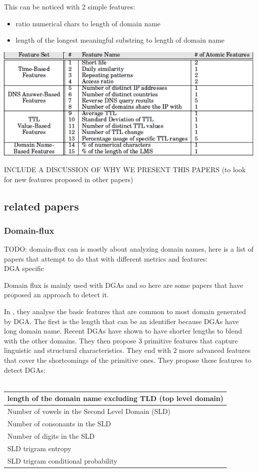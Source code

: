 This can be noticed with 2 simple features:\\
\begin{itemize}[noitemsep]
\item ratio numerical chars to length of domain name
\item length of the longest meaningful substring to length of domain name
\end{itemize}
\includegraphics[scale=.3]{img/exposure_features.png}


INCLUDE A DISCUSSION OF WHY WE PRESENT THIS PAPERS (to look for new features proposed in other papers)



\subsection{related papers}
\subsubsection{Domain-flux}
TODO: domain-flux can is mostly about analyzing domain names, here is a list of papers that attempt to do that with different metrics and features:  
\cite{dns-traffic}\\
DGA specific\\
\cite{phoenix}

Domain flux is mainly used with DGAs and so here are some papers that have proposed an approach to detect it.

In \cite{dga}, they analyse the basic features that are common to most domain generated by DGA. The first is the length that can be an identifier because DGAs have long domain name. Recent DGAs have shown to have shorter lengths to blend with the other domains. They then propose 3 primitive features that capture linguistic and structural characteristics. They end with 2 more advanced features that cover the shortcomings of the primitive ones. They propose these features to detect DGAs:\\\\
\begin{tabular}{|l|}
\hline
length of the domain name excluding TLD (top level domain)\\
\hline
Number of vowels in the Second Level Domain (SLD)\\
\hline
Number of consonants in the SLD\\
\hline
Number of digits in the SLD\\
\hline
SLD trigram entropy\\
\hline
SLD trigram conditional probability\\
\hline
\end{tabular}
\\


